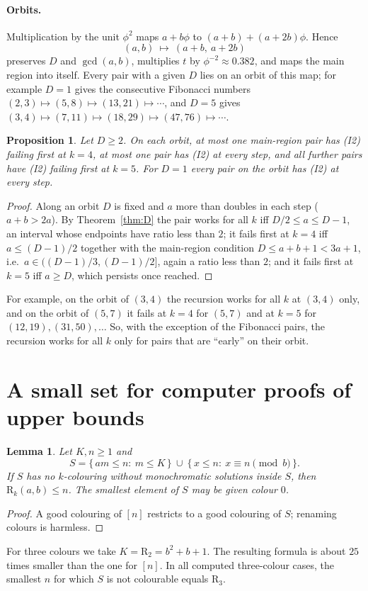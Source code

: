 \documentclass[11pt,a4paper]{article}
\newtheorem{lemma}[theorem]{Lemma}
\newtheorem{proposition}[theorem]{Proposition}
\theoremstyle{definition}
\theoremstyle{remark}
\newcommand{\R}{\mathrm{R}}
\begin{document}
\paragraph{Orbits.} Multiplication by the unit $\phi^2$ maps $a+b\phi$ to $(a+b)+(a+2b)\phi$. Hence
\[
  (a,b)\ \longmapsto\ (a+b,\ a+2b)
\]
preserves $D$ and $\gcd(a,b)$, multiplies $t$ by $\phi^{-2}\approx0.382$, and maps the main region into itself. Every pair with a given $D$ lies on an orbit of this map; for example $D=1$ gives the consecutive Fibonacci numbers $(2,3)\mapsto(5,8)\mapsto(13,21)\mapsto\cdots$, and $D=5$ gives $(3,4)\mapsto(7,11)\mapsto(18,29)\mapsto(47,76)\mapsto\cdots$.
\begin{proposition}\label{prop:orbit}
Let $D\ge2$. On each orbit, at most one main-region pair has (I2) failing first at $k=4$, at most one pair has (I2) at every step, and all further pairs have (I2) failing first at $k=5$. For $D=1$ every pair on the orbit has (I2) at every step.
\end{proposition}
\begin{proof}
Along an orbit $D$ is fixed and $a$ more than doubles in each step ($a+b>2a$). By Theorem~\ref{thm:D} the pair works for all $k$ iff $D/2\le a\le D-1$, an interval whose endpoints have ratio less than $2$; it fails first at $k=4$ iff $a\le(D-1)/2$ together with the main-region condition $D\le a+b+1<3a+1$, i.e.\ $a\in((D-1)/3,(D-1)/2]$, again a ratio less than $2$; and it fails first at $k=5$ iff $a\ge D$, which persists once reached.
\end{proof}
For example, on the orbit of $(3,4)$ the recursion works for all $k$ at $(3,4)$ only, and on the orbit of $(5,7)$ it fails at $k=4$ for $(5,7)$ and at $k=5$ for $(12,19),(31,50),\dots$ So, with the exception of the Fibonacci pairs, the recursion works for all $k$ only for pairs that are ``early'' on their orbit.

\clearpage
\section{A small set for computer proofs of upper bounds}\label{sec:small}
\begin{lemma}\label{lem:small}
Let $K,n\ge1$ and
\[
  S=\{\,am\le n:\ m\le K\,\}\ \cup\ \{\,x\le n:\ x\equiv n\pmod b\,\}.
\]
If $S$ has no $k$-colouring without monochromatic solutions inside $S$, then $\R_k(a,b)\le n$. The smallest element of $S$ may be given colour $0$.
\end{lemma}
\begin{proof}
A good colouring of $[n]$ restricts to a good colouring of $S$; renaming colours is harmless.
\end{proof}
For three colours we take $K=\R_2=b^2+b+1$. The resulting formula is about $25$ times smaller than the one for $[n]$. In all computed three-colour cases, the smallest $n$ for which $S$ is not colourable equals $\R_3$.
\end{document}
